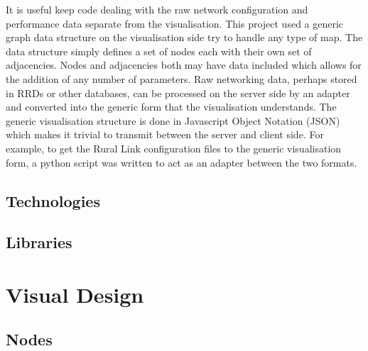 \documentclass{article}
\begin{document}
It is useful keep code dealing with the raw network configuration and
performance data separate from the visualisation. This project used a generic
graph data structure on the visualisation side try to handle any type of map.
The data structure simply defines a set of nodes each with their own set of
adjacencies. Nodes and adjacencies both may have data included which allows for
the addition of any number of parameters. Raw networking data, perhaps stored in
RRDs or other databases, can be processed on the server side by an adapter and
converted into the generic form that the visualisation understands.  The generic
visualisation structure is done in Javascript Object Notation (JSON) which makes
it trivial to transmit between the server and client side. \cite{rfc4627}  For
example, to get the Rural Link configuration files to the generic visualisation
form, a python script was written to act as an adapter between the two formats. 


\subsection{Technologies}
\label{sec:technologies}


\subsection{Libraries}
\label{sec:libraries}

\section{Visual Design}
\label{sec:visual-design}

\subsection{Nodes}
\label{sec:nodes}
\end{document}
